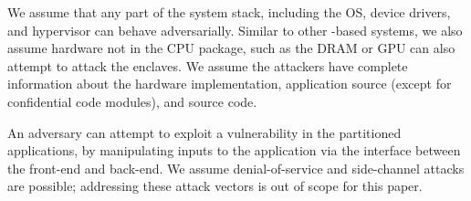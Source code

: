 









We assume that any part of the system stack, including the OS,
device drivers, and hypervisor can behave adversarially.
Similar to other \sgx{}-based systems, we also assume 
hardware not in the CPU package, such as the DRAM or GPU 
can also attempt to attack the enclaves.
We assume the attackers have complete information
about the \sgx{} hardware implementation, application source (except for confidential code modules), and \sysname{} source code.

An adversary can attempt to
exploit a vulnerability in the partitioned applications,
by manipulating inputs to the application via the interface between the
front-end and back-end.
We assume denial-of-service and side-channel attacks are possible; 
addressing these attack vectors is out of scope for this paper.



